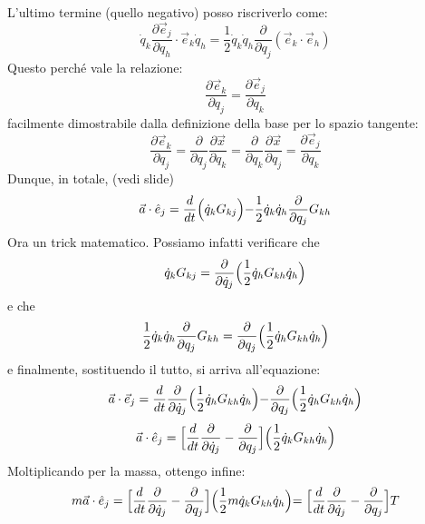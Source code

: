 \documentclass[a4paper,openany]{article}
\begin{document}
	L'ultimo termine (quello negativo) posso riscriverlo come:
	$$
	\dot{q}_{k}\dfrac{\partial \vec{e}_{j}}{\partial q_{h}}\cdot \vec{e}_{k}\dot{q}_{h} = \dfrac{1}{2}\dot{q}_{k}\dot{q}_{h}\dfrac{\partial}{\partial q_{j}}(\vec{e}_{k}\cdot\vec{e}_{h})
	$$
	Questo perché vale la relazione:
	$$
	\dfrac{\partial \vec{e}_{k}}{\partial q_{j}} = \dfrac{\partial \vec{e}_{j}}{\partial q_{k}}
	$$
	facilmente dimostrabile dalla definizione della base per lo spazio tangente:
	$$
	\dfrac{\partial \vec{e}_{k}}{\partial q_{j}} = \dfrac{\partial}{\partial q_j} \dfrac{\partial \vec{x}}{\partial q_k} = \dfrac{\partial}{\partial q_k} \dfrac{\partial \vec{x}}{\partial q_j} =  \dfrac{\partial \vec{e}_{j}}{\partial q_{k}}
	$$
	Dunque, in totale, (vedi slide)
	\begin{equation}
		\vec{a}\cdot\hat{e}_{j} = \dfrac{d}{dt}\Bigl(\dot{q}_{k}G_{kj}\Bigl) - \dfrac{1}{2}\dot{q}_{k}\dot{q}_{h}\dfrac{\partial}{\partial q_{j}}G_{kh}
	\end{equation}
	Ora un trick matematico. Possiamo infatti verificare che
	\begin{equation}\label{key}
		\dot{q}_kG_{kj} = \dfrac{\partial}{\partial \dot{q}_j}\Bigl(\dfrac{1}{2}\dot{q}_h G_{kh}\dot{q}_h\Bigl)
	\end{equation}
	e che
	\begin{equation}\label{key}
		\dfrac{1}{2}\dot{q}_{k}\dot{q}_{h}\dfrac{\partial}{\partial q_{j}}G_{kh} = \dfrac{\partial}{\partial q_j}\Bigl(\dfrac{1}{2}\dot{q}_h G_{kh}\dot{q}_h\Bigl)
	\end{equation}
	e finalmente, sostituendo il tutto, si arriva all'equazione:
	\begin{equation}
		\vec{a}\cdot\vec{e}_{j} = \dfrac{d}{dt}\dfrac{\partial}{\partial \dot{q}_j}\Bigl(\dfrac{1}{2}\dot{q}_h G_{kh}\dot{q}_h\Bigl) -\dfrac{\partial}{\partial q_j}\Bigl(\dfrac{1}{2}\dot{q}_h G_{kh}\dot{q}_h\Bigl)
	\end{equation}
	\begin{equation}
		\vec{a}\cdot\hat{e}_{j}  = \Bigl[\dfrac{d}{dt}\dfrac{\partial }{\partial \dot{q}_{j}}-\dfrac{\partial }{\partial q_{j}}\Bigl]\Bigl(\dfrac{1}{2}\dot{q}_{k}G_{kh}\dot{q}_{h}\Bigl)
	\end{equation}
	Moltiplicando per la massa, ottengo infine:
	\begin{equation}
		m\vec{a}\cdot\hat{e}_{j}  = \Bigl[\dfrac{d}{dt}\dfrac{\partial }{\partial \dot{q}_{j}}-\dfrac{\partial }{\partial q_{j}}\Bigl]\Bigl(\dfrac{1}{2}m\dot{q}_{k}G_{kh}\dot{q}_{h}\Bigl) =  \Bigl[\dfrac{d}{dt}\dfrac{\partial }{\partial \dot{q}_{j}}-\dfrac{\partial }{\partial q_{j}}\Bigl]T
		\label{AccCov}
	\end{equation}
\end{document}
